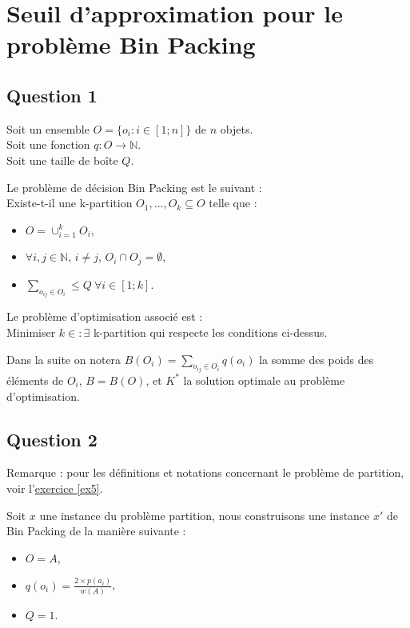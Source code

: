 \section{Seuil d'approximation pour le problème Bin Packing}\label{ex10}

\subsection{Question 1}\label{ex10_q1}
Soit un ensemble $O = \{o_i : i \in [1;n]\}$ de $n$ objets.\\
Soit une fonction $q : O \rightarrow \mathbb{N}$.\\
Soit une taille de boîte $Q$.

Le problème de décision Bin Packing est le suivant :\\
Existe-t-il une k-partition $O_1,...,O_k \subseteq O$ telle que :
\begin{itemize}
	\item $O = \cup_{i = 1}^{k}O_i$,
	\item $\forall i,j \in \mathbb{N}$, $i \neq j$, $O_i \cap O_j = \emptyset$,
	\item $\sum_{o_{ij} \in O_i} \leq Q\ \forall i \in [1;k]$.
\end{itemize}

Le problème d'optimisation associé est :\\
Minimiser $k \in \mathbb : \exists$ k-partition qui respecte les conditions ci-dessus.

Dans la suite on notera $B(O_i) = \sum_{o_{ij} \in O_i}q(o_i)$ la somme des poids des
éléments de $O_i$, $B = B(O)$, et $K^*$ la solution optimale au problème d'optimisation.

\subsection{Question 2}\label{ex10_q2}
Remarque : pour les définitions et notations concernant le problème de partition, voir
l'\href{ex5}{exercice \ref{ex5}}.

Soit $x$ une instance du problème partition, nous construisons
une instance $x'$ de Bin Packing de la manière suivante :
\begin{itemize}
	\item $O = A$,
	\item $q(o_i) = \frac{2 \times p(a_i)}{w(A)}$,
	\item $Q = 1$.
\end{itemize}


